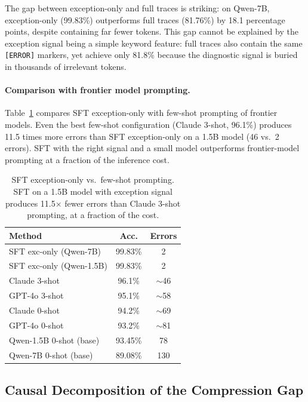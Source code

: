 \documentclass[11pt,a4paper]{article}
\begin{document}
The gap between exception-only and full traces is striking: on Qwen-7B, exception-only (99.83\%) outperforms full traces (81.76\%) by 18.1 percentage points, despite containing far fewer tokens. This gap cannot be explained by the exception signal being a simple keyword feature: full traces also contain the same \texttt{[ERROR]} markers, yet achieve only 81.8\% because the diagnostic signal is buried in thousands of irrelevant tokens.

\paragraph{Comparison with frontier model prompting.}
Table~\ref{tab:fewshot} compares SFT exception-only with few-shot prompting of frontier models. Even the best few-shot configuration (Claude 3-shot, 96.1\%) produces 11.5 times more errors than SFT exception-only on a 1.5B model (46 vs.\ 2 errors). SFT with the right signal and a small model outperforms frontier-model prompting at a fraction of the inference cost.

\begin{table}[t]
\centering
\small
\begin{tabular}{lcc}
\toprule
\textbf{Method} & \textbf{Acc.} & \textbf{Errors} \\
\midrule
SFT exc-only (Qwen-7B) & 99.83\% & 2 \\
SFT exc-only (Qwen-1.5B) & 99.83\% & 2 \\
Claude 3-shot & 96.1\% & $\sim$46 \\
GPT-4o 3-shot & 95.1\% & $\sim$58 \\
Claude 0-shot & 94.2\% & $\sim$69 \\
GPT-4o 0-shot & 93.2\% & $\sim$81 \\
Qwen-1.5B 0-shot (base) & 93.45\% & 78 \\
Qwen-7B 0-shot (base) & 89.08\% & 130 \\
\bottomrule
\end{tabular}
\caption{SFT exception-only vs.\ few-shot prompting. SFT on a 1.5B model with exception signal produces 11.5$\times$ fewer errors than Claude 3-shot prompting, at a fraction of the cost.}
\label{tab:fewshot}
\end{table}

\subsection{Causal Decomposition of the Compression Gap}
\label{sec:causal}
\end{document}
